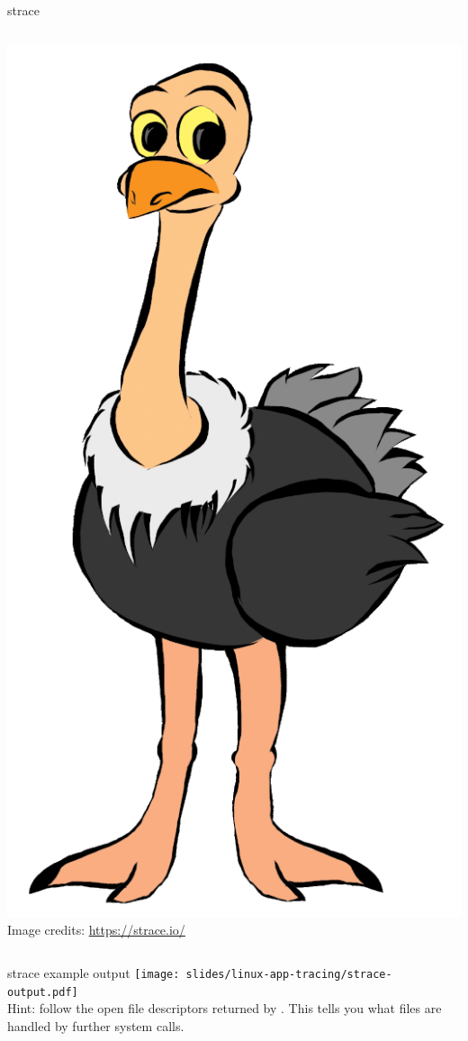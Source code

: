 \begin{frame}[fragile]{strace}
\begin{columns}
  \includegraphics[height=0.7\textheight]{slides/linux-app-tracing/strace-mascot.png}\\
  \tiny Image credits: \url{https://strace.io/}
  \end{columns}
\end{frame}

\begin{frame}[fragile]{strace example output}
  \texttt{[image: slides/linux-app-tracing/strace-output.pdf]}\\
  Hint: follow the open file descriptors returned by .
  This tells you what files are handled by further system calls.
\end{frame}

